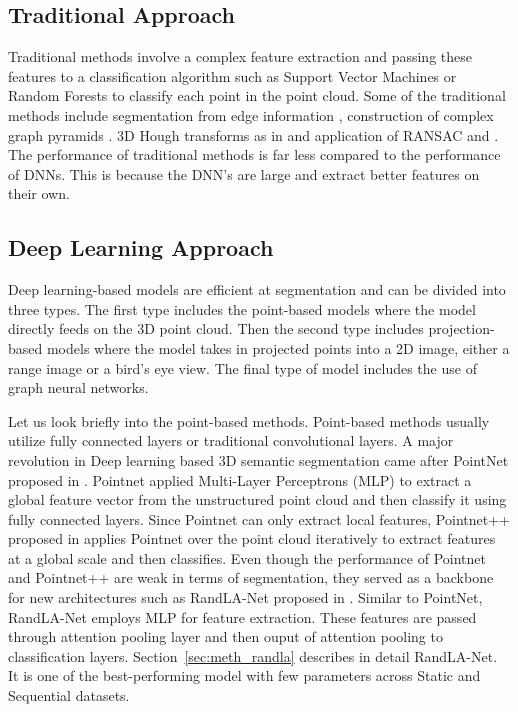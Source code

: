 \subsection{Traditional Approach}
Traditional methods involve a complex feature extraction and passing these features to a classification algorithm such as Support Vector Machines or Random Forests to classify each point in the point cloud.
Some of the traditional methods include segmentation from edge information \cite{bhanu1986range}, construction of complex graph pyramids \cite{koster}.
3D Hough transforms as in \cite{vosselman20013d} and application of RANSAC \cite{schnabel2007efficient} and \cite{tarsha2007hough}.
The performance of traditional methods is far less compared to the performance of DNNs.
This is because the DNN's are large and extract better features on their own.

\subsection{Deep Learning Approach}
\label{sec:dl_approach}
Deep learning-based models are efficient at segmentation and can be divided into three types.
The first type includes the point-based models where the model directly feeds on the 3D point cloud.
Then the second type includes projection-based models where the model takes in projected points into a 2D image, either a range image or a bird's eye view.
The final type of model includes the use of graph neural networks.

Let us look briefly into the point-based methods. Point-based methods usually utilize fully connected layers or traditional convolutional layers.
A major revolution in Deep learning based 3D semantic segmentation came after PointNet proposed in \cite{Qi_2017_CVPR_pointnet}.
Pointnet applied Multi-Layer Perceptrons (MLP) to extract a global feature vector from the unstructured point cloud and then classify it using fully connected layers.
Since Pointnet can only extract local features, Pointnet++ proposed in \cite{qi2017pointnet++} applies Pointnet over the point cloud iteratively to extract features at a global scale and then classifies.
Even though the performance of Pointnet and Pointnet++ are weak in terms of segmentation, they served as a backbone for new architectures such as RandLA-Net proposed in \cite{Hu_2020_CVPR_Randla}.
Similar to PointNet, RandLA-Net employs MLP for feature extraction. These features are passed through attention pooling layer and then ouput of attention pooling to classification layers.
 Section~\ref{sec:meth_randla} describes in detail RandLA-Net.
It is one of the best-performing model with few parameters across Static and Sequential datasets.

